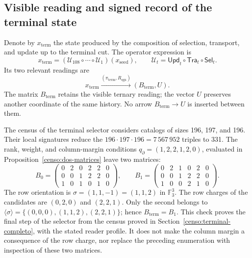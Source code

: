 


\subsection{Visible reading and signed record of the terminal state}
\label{subsec:k-terminal}

Denote by \(x_{\mathrm{term}}\) the state produced by the composition
of selection, transport, and update up to the terminal cut. The
operator expression is
\[
 x_{\mathrm{term}}=
 (\mathcal U_{108}\circ\cdots\circ\mathcal U_1)(x_{\mathrm{seed}}),
 \qquad \mathcal U_t=\mathsf{Upd}_t\circ\mathsf{Tra}_t\circ\mathsf{Sel}_t.
\]
Its two relevant readings are
\[
 x_{\mathrm{term}}
 \xrightarrow{(\pi_{\mathrm{term}},R_{\mathrm{sgn}})}
 (B_{\mathrm{term}},U).
\]
The matrix \(B_{\mathrm{term}}\) retains the visible ternary reading; the
vector \(U\) preserves another coordinate of the same history. No arrow
\(B_{\mathrm{term}}\to U\) is inserted between them.

The census of the terminal selector considers catalogs
of sizes 196, 197, and 196. Their local signatures reduce the
\(196\cdot197\cdot196=7\,567\,952\) triples to 331. The rank,
weight, and column-margin conditions \(q_{\partial}=(1,2,2,1,2,0)\), evaluated in
Proposition~\ref{censo:dos-matrices} leave two matrices:
\[
 B_0=\begin{pmatrix}0&2&0&2&2&0\\0&0&1&2&2&0\\1&0&1&0&1&0\end{pmatrix},
 \qquad
 B_1=\begin{pmatrix}0&2&1&0&2&0\\0&0&1&2&2&0\\1&0&0&2&1&0\end{pmatrix}.
\]
The row orientation is \(\sigma=(1,1,-1)=(1,1,2)\) in
\(\mathbb F_3^3\). The row charges of the candidates are
\((0,2,0)\) and \((2,2,1)\). Only the second belongs to
\(\langle\sigma\rangle=\{(0,0,0),(1,1,2),(2,2,1)\}\); hence
\(B_{\mathrm{term}}=B_1\). This check proves the final step of the
selector from the census proved in Section~\ref{censo:terminal-completo},
with the stated reader profile. It does not make the column margin
a consequence of the row charge, nor replace the preceding enumeration
with inspection of these two matrices.

